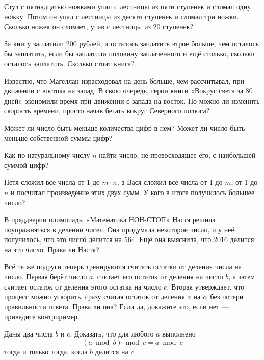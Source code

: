 \begin{itemize}
\itA Стул с пятнадцатью ножками упал с лестницы из пяти ступенек и сломал одну ножку. Потом он упал с лестницы из десяти ступенек и сломал три ножки. Сколько ножек он сломает, упав с лестницы из 20 ступенек?

\itB За книгу заплатили 200 рублей, и осталось заплатить втрое больше, чем осталось бы заплатить, если бы заплатили половину заплаченного и ещё столько, сколько осталось заплатить. Сколько стоит книга?

\itC Известно, что Магеллан израсходовал на день больше, чем рассчитывал, при движении с востока на запад. В свою очередь, герои книги «Вокруг света за 80 дней» экономили время при движении с запада на восток. Но можно ли изменить скорость времени, просто начав бегать вокруг Северного полюса?
\end{itemize}

\begin{itemize}
\itA Может ли число быть меньше количества цифр в нём? Может ли число быть меньше собственной суммы цифр?

\itB Как по натуральному числу $n$ найти число, не превосходящее его, с наибольшей суммой цифр?

\itC Петя сложил все числа от 1 до $m \cdot n$, а Вася сложил все числа от 1 до $m$, от 1 до $n$ и посчитал произведение этих двух сумм. У кого в итоге получилось большее число?
\end{itemize}

\begin{itemize}
\itA В преддверии олимпиады «Математика НОН-СТОП» Настя решила поупражняться в делении чисел. Она придумала некоторое число, и у неё получилось, что это число делится на 564. Ещё она выяснила, что 2016 делится на это число. Права ли Настя?

\itB Всё те же подруги теперь тренируются считать остатки от деления числа на число. Первая берёт число $a$, считает его остаток от деления на число $b$, а затем считает остаток от деления этого остатка на число $c$. Вторая утверждает, что процесс можно ускорить, сразу считая остаток от деления $a$ на $c$, без потери правильности ответа. Права ли она? Если да, докажите это, если нет — приведите контрпример.

\itC Даны два числа $b$ и $c$. Доказать, что для любого $a$ выполнено
	$$(a \bmod b) \bmod c = a \bmod c$$
тогда и только тогда, когда $b$ делится на $c$.
\end{itemize}

